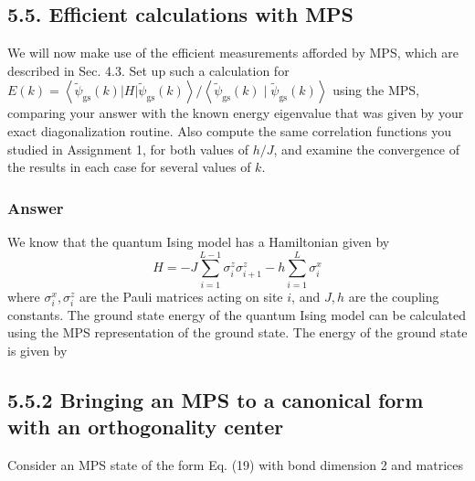 \documentclass[12pt]{article}
\begin{document}
\subsection*{5.5. Efficient calculations with MPS}
We will now make use of the efficient measurements afforded by MPS, which are described in Sec. 4.3. Set up such a calculation for $E(k)=\left\langle\tilde{\psi}_{\mathrm{gs}}(k)|H| \tilde{\psi}_{\mathrm{gs}}(k)\right\rangle /\left\langle\tilde{\psi}_{\mathrm{gs}}(k) \mid \tilde{\psi}_{\mathrm{gs}}(k)\right\rangle$ using the MPS, comparing your answer with the known energy eigenvalue that was given by your exact diagonalization routine. Also compute the same correlation functions you studied in Assignment 1, for both values of $h / J$, and examine the convergence of the results in each case for several values of $k$.
\subsubsection{Answer}
We know that the quantum Ising model has a Hamiltonian given by
\begin{equation*}
H=-J \sum_{i=1}^{L-1} \sigma_{i}^{z} \sigma_{i+1}^{z}-h \sum_{i=1}^{L} \sigma_{i}^{x} \tag{1}
\end{equation*}
where $\sigma_{i}^{x}, \sigma_{i}^{z}$ are the Pauli matrices acting on site $i$, and $J, h$ are the coupling constants. The ground state energy of the quantum Ising model can be calculated using the MPS representation of the ground state. The energy of the ground state is given by

\subsection*{5.5.2 Bringing an MPS to a canonical form with an orthogonality center}
Consider an MPS state of the form Eq. (19) with bond dimension 2 and matrices
\end{document}

